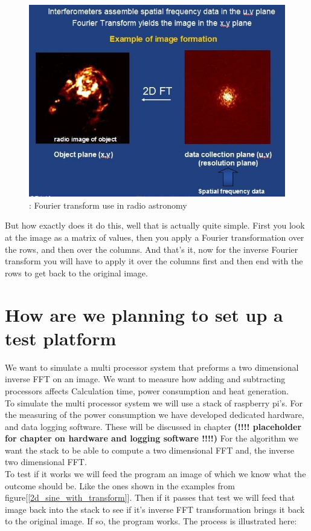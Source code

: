 \documentclass[11pt, A4, oneside]{article}
\begin{document}
\begin{figure}[!ht]
	\centering
	\includegraphics[width=\linewidth]{example_fft}
	\caption{: Fourier transform use in radio astronomy}
	\label{FFT use in radio astronomy}
\end{figure} 

But how exactly does it do this, well that is actually quite simple. First you look at the image as a matrix of values, then you apply a Fourier transformation over the rows, and then over the columns. And that's it, now for the inverse Fourier transform you will have to apply it over the columns first and then end with the rows to get back to the original image.     

\section{How are we planning to set up a test platform}

We want to simulate a multi processor system that preforms a two dimensional inverse FFT on an image. We want to measure how adding and subtracting processors affects Calculation time, power consumption and heat generation.\\To simulate the multi processor system we will use a stack of raspberry pi's. For the measuring of the power consumption we have developed dedicated hardware, and data logging software. These will be discussed in chapter \textbf{(!!!! placeholder for chapter on hardware and logging software !!!!)} 
For the algorithm we want the stack to be able to compute a two dimensional FFT and, the inverse two dimensional FFT.\\ To test if it works we will feed the program an image of which we know what the outcome should be. Like the ones shown in the examples from figure[\ref{2d_sine_with_transform}]. Then if it passes that test we will feed that image back into the stack to see if it's inverse FFT transformation brings it back to the original image. If so, the program works. The process is illustrated here: 
\end{document}

